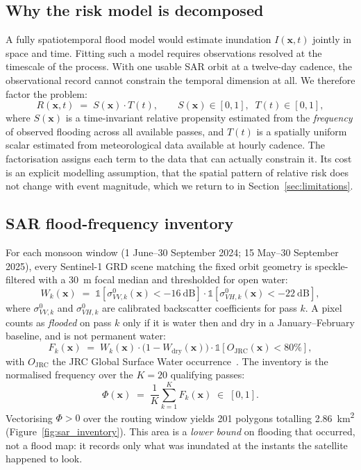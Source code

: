 \documentclass[journal]{IEEEtran}
\newcommand{\Sx}{S(\mathbf{x})}
\newcommand{\Tt}{T(t)}
\newcommand{\Rxt}{R(\mathbf{x},t)}
\begin{document}
\subsection{Why the risk model is decomposed}
\label{sec:method-decomp}
A fully spatiotemporal flood model would estimate inundation
$I(\mathbf{x},t)$ jointly in space and time. Fitting such a model requires
observations resolved at the timescale of the process. With one usable SAR orbit
at a twelve-day cadence, the observational record cannot constrain the temporal
dimension at all. We therefore factor the problem:
\begin{equation}
\Rxt \;=\; \Sx \cdot \Tt,
\qquad \Sx\in[0,1],\;\; \Tt\in[0,1],
\label{eq:fusion}
\end{equation}
where $\Sx$ is a time-invariant relative propensity estimated from the
\emph{frequency} of observed flooding across all available passes, and $\Tt$ is a
spatially uniform scalar estimated from meteorological data available at hourly
cadence. The factorisation assigns each term to the data that can actually
constrain it. Its cost is an explicit modelling assumption, that the spatial
pattern of relative risk does not change with event magnitude, which we return to
in Section~\ref{sec:limitations}.

\subsection{SAR flood-frequency inventory}
For each monsoon window (1 June--30 September 2024; 15 May--30 September 2025),
every Sentinel-1 GRD scene matching the fixed orbit geometry is speckle-filtered
with a \SI{30}{\metre} focal median and thresholded for open water:
\begin{equation}
W_k(\mathbf{x}) \;=\;
\mathbb{1}\!\left[\sigma^0_{VV,k}(\mathbf{x}) < \SI{-16}{\deci\bel}\right]\cdot
\mathbb{1}\!\left[\sigma^0_{VH,k}(\mathbf{x}) < \SI{-22}{\deci\bel}\right],
\label{eq:water}
\end{equation}
where $\sigma^0_{VV,k}$ and $\sigma^0_{VH,k}$ are calibrated backscatter
coefficients for pass $k$. A pixel counts as \emph{flooded} on pass $k$ only if it
is water then and dry in a January--February baseline, and is not permanent water:
\begin{equation}
F_k(\mathbf{x}) \;=\; W_k(\mathbf{x})\cdot\bigl(1-W_{\text{dry}}(\mathbf{x})\bigr)
\cdot\mathbb{1}\!\left[O_{\text{JRC}}(\mathbf{x}) < 80\%\right],
\label{eq:floodpass}
\end{equation}
with $O_{\text{JRC}}$ the JRC Global Surface Water occurrence~\citep{pekel2016}.
The inventory is the normalised frequency over the $K=20$ qualifying passes:
\begin{equation}
\Phi(\mathbf{x}) \;=\; \frac{1}{K}\sum_{k=1}^{K} F_k(\mathbf{x}) \;\in\; [0,1].
\label{eq:freq}
\end{equation}
Vectorising $\Phi>0$ over the routing window yields 201 polygons totalling
\SI{2.86}{\kilo\metre\squared} (Figure~\ref{fig:sar_inventory}). This area is a
\emph{lower bound} on flooding that occurred, not a flood map: it records only
what was inundated at the instants the satellite happened to look.
\end{document}
